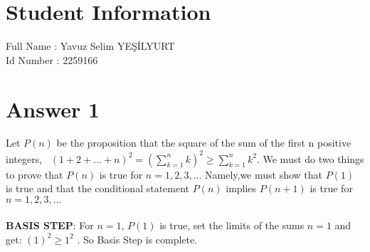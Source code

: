 \documentclass[12pt]{article}
\begin{document}
\section*{Student Information } 
Full Name :  Yavuz Selim YEŞİLYURT \\
Id Number :  2259166 \\

\section*{Answer 1}
Let $P(n)$ be the proposition that the square of the sum of the first n positive integers, \ $(1 + 2 + ... + n)^2 =
(\sum\limits_{k=1}^n k)^2  \geq \sum\limits_{k=1}^n k^2 $. We must do two things to prove that $P(n)$ is true for $n = 1, 2, 3, ...$
Namely,we must show that $P(1)$ is true and that the conditional statement $P(n)$ implies $P(n + 1)$
is true for $n = 1, 2, 3, ...$ \\\\

\textbf{BASIS STEP}: For $n = 1$, $P(1)$ is true, set the limits of the sums $n = 1$ and get: $(1)^2 \geq 1^2$ . So Basis Step is complete.\\\\
\end{document}
